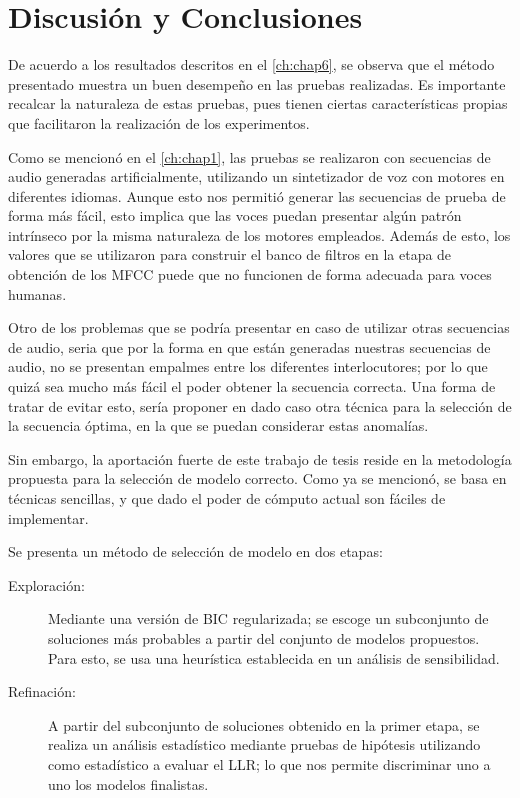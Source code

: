 
\chapter{Discusión y Conclusiones}\label{ch:chap7}

De acuerdo a los resultados descritos en el \autoref{ch:chap6}, se observa que el método presentado muestra un buen desempeño en las pruebas realizadas. Es importante recalcar la naturaleza de estas pruebas, pues tienen ciertas características propias que facilitaron la realización de los experimentos.

Como se mencionó en el \autoref{ch:chap1}, las pruebas se realizaron con secuencias de audio generadas artificialmente, utilizando un sintetizador de voz con motores en diferentes idiomas. Aunque esto nos permitió generar las secuencias de prueba de forma más fácil, esto implica que las voces puedan presentar algún patrón intrínseco por la misma naturaleza de los motores empleados. Además de esto, los valores que se utilizaron para construir el banco de filtros en la etapa de obtención de los \ac{MFCC} puede que no funcionen de forma adecuada para voces humanas.

Otro de los problemas que se podría presentar en caso de utilizar otras secuencias de audio, seria que por la forma en que están generadas nuestras secuencias de audio, no se presentan empalmes entre los diferentes interlocutores; por lo que quizá sea mucho más fácil el poder obtener la secuencia correcta. Una forma de tratar de evitar esto, sería proponer en dado caso otra técnica para la selección de la secuencia óptima, en la que se puedan considerar estas anomalías.

Sin embargo, la aportación fuerte de este trabajo de tesis reside en la metodología propuesta para la selección de modelo correcto. Como ya se mencionó, se basa en técnicas sencillas, y que dado el poder de cómputo actual son fáciles de implementar.

Se presenta un método de selección de modelo en dos etapas: 
\begin{description}
\item[Exploración:] Mediante una versión de \ac{BIC} regularizada; se escoge un subconjunto de soluciones más probables a partir del conjunto de modelos propuestos. Para esto, se usa una heurística establecida en un análisis de sensibilidad. 

\item[Refinación:] A partir del subconjunto de soluciones obtenido en la primer etapa, se realiza un análisis estadístico mediante pruebas de hipótesis utilizando como estadístico a evaluar el \ac{LLR}; lo que nos permite discriminar uno a uno los modelos finalistas.
\end{description}


